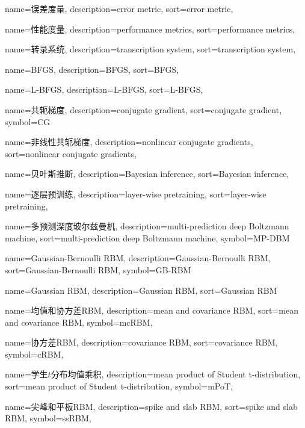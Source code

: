 {
  name=误差度量,
  description={error metric},
  sort={error metric},
}

{
  name=性能度量,
  description={performance metrics},
  sort={performance metrics},
}

{
  name=转录系统,
  description={transcription system},
  sort={transcription system},
}

{
  name=BFGS,
  description={BFGS},
  sort={BFGS},
}

{
  name=L-BFGS,
  description={L-BFGS},
  sort={L-BFGS},
}

{
  name=共轭梯度,
  description={conjugate gradient},
  sort={conjugate gradient},
  symbol={CG}
}

{
  name=非线性共轭梯度,
  description={nonlinear conjugate gradients},
  sort={nonlinear conjugate gradients},
}

{
  name=贝叶斯推断,
  description={Bayesian inference},
  sort={Bayesian inference},
}

{
  name=逐层预训练,
  description={layer-wise pretraining},
  sort={layer-wise pretraining},
}

{
  name=多预测深度玻尔兹曼机,
  description={multi-prediction deep Boltzmann machine},
  sort={multi-prediction deep Boltzmann machine},
  symbol={MP-DBM}
}

{
  name=Gaussian-Bernoulli RBM,
  description={Gaussian-Bernoulli RBM},
  sort={Gaussian-Bernoulli RBM},
  symbol={GB-RBM}
}

{
  name=Gaussian RBM,
  description={Gaussian RBM},
  sort={Gaussian RBM}
}

{
  name=均值和协方差RBM,
  description={mean and covariance RBM},
  sort={mean and covariance RBM},
  symbol={mcRBM},
}

{
  name=协方差RBM,
  description={covariance RBM},
  sort={covariance RBM},
  symbol={cRBM},
}


{
  name=学生$t$分布均值乘积,
  description={mean product of Student t-distribution},
  sort={mean product of Student t-distribution},
  symbol={mPoT},
}

{
  name=尖峰和平板RBM,
  description={spike and slab RBM},
  sort={spike and slab RBM},
  symbol={ssRBM},
}

